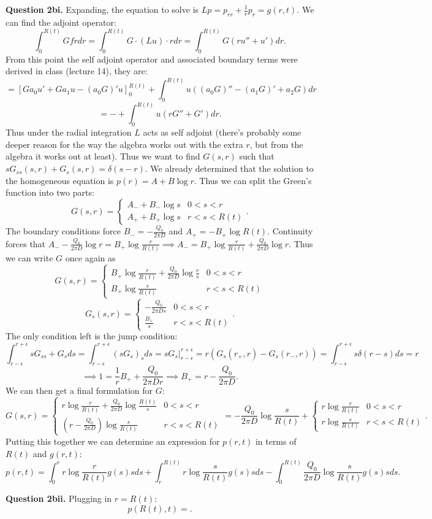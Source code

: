 \documentclass[letterpaper, reqno,11pt]{article}
\begin{document}
{\medskip\noindent\bf Question 2bi.} Expanding, the equation to solve is $Lp=p_{rr}+\frac{1}{r}p_r=g(r,t)$. We can find the adjoint operator:
\[
\int_0^{R(t)}Gfrdr=\int_0^{R(t)}G\cdot (Lu)\cdot rdr=\int_0^{R(t)}G\left( ru''+u' \right) dr
.\]
From this point the self adjoint operator and associated boundary terms were derived in class (lecture 14), they are:
\[
  =\left[Ga_0u'+Ga_1u-(a_0G)'u\right]_{0}^{R(t)}+\int_{0}^{R(t)}u\left( (a_0G)''-(a_1G)'+a_2G \right) dr
\]
\[
=-+\int_0^{R(t)}u\left( rG''+G' \right) dr
.\]
Thus under the radial integration $L$ acts as self adjoint (there's probably some deeper reason for the way the algebra works out with the extra $r$, but from the algebra it works out at least). Thus we want to find $G(s,r)$ such that $sG_{ss}(s,r)+G_s(s,r)=\delta(s-r)$. We already determined that the solution to the homogeneous equation is $p(r)=A+B\log r$. Thus we can split the Green's function into two parts:
\[
G(s,r)=\begin{cases}
  A_-+B_-\log s&0<s<r\\
  A_++B_+\log s&r<s<R(t)
\end{cases}
.\]
The boundary conditions force $B_-= -\frac{Q_0}{2\pi D}$ and $A_+=-B_+\log R(t)$. Continuity forces that $A_--\frac{Q_0}{2\pi D}\log r=B_+\log \frac{r}{R(t)}\implies A_-=B_+\log \frac{r}{R(t)}+\frac{Q_0}{2 \pi D}\log r$. Thus we can write $G$ once again as
\[
G(s,r)=\begin{cases}
  B_+\log \frac{r}{R(t)}+\frac{Q_0}{2\pi D}\log \frac{r}{s}&0<s<r\\
  B_+\log \frac{s}{R(t)}&r<s<R(t)
\end{cases}
\]
\[
G_s(s,r)=\begin{cases}
  -\frac{Q_0}{2\pi Ds}&0<s<r\\
  \frac{B_+}{s}&r<s<R(t)
\end{cases}
.\]
The only condition left is the jump condition:
\[
\int_{r-\epsilon}^{r+\epsilon}sG_{ss}+G_sds=\int_{r-\epsilon}^{r+\epsilon}(sG_s)_sds=sG_s\bigg|_{r-\epsilon}^{r+\epsilon}=r\left( G_s(r_+,r)-G_s(r_-,r) \right)=\int_{r-\epsilon}^{r+\epsilon}s\delta(r-s)ds=r
\]
\[
\implies 1=\frac{1}{r}B_++\frac{Q_0}{2\pi Dr}\implies B_+=r-\frac{Q_0}{2\pi D}
.\]
We can then get a final formulation for $G$:
\[
G(s,r)=\begin{cases}
  r\log \frac{r}{R(t)}+\frac{Q_0}{2\pi D}\log \frac{R(t)}{s}&0<s<r\\
  \left( r-\frac{Q_0}{2\pi D} \right) \log \frac{s}{R(t)}&r<s<R(t)
\end{cases}=-\frac{Q_0}{2\pi D}\log \frac{s}{R(t)}+\begin{cases}
  r\log \frac{r}{R(t)}&0<s<r\\
  r\log \frac{s}{R(t)}&r<s<R(t)
\end{cases}
.\]
Putting this together we can determine an expression for $p(r,t)$ in terms of $R(t)$ and $g(r,t)$:
\[
p(r,t)=\int_0^{r}r\log \frac{r}{R(t)}g(s)sds+\int_r^{R(t)}r\log \frac{s}{R(t)}g(s)sds-\int_0^{R(t)}\frac{Q_0}{2\pi D}\log \frac{s}{R(t)} g(s)sds
.\]

{\medskip\noindent\bf Question 2bii.} Plugging in $r=R(t)$:
\[
  p(R(t),t)=
.\]
\end{document}
